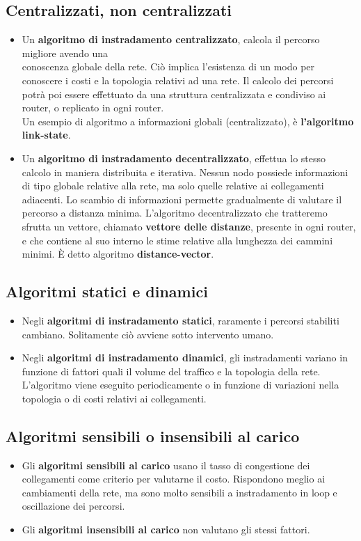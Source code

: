 \subsection{Centralizzati, non centralizzati}
\begin{itemize}
	\item Un \textbf{algoritmo di instradamento centralizzato}, calcola il percorso migliore avendo una\\ conoscenza globale della rete. Ciò implica l'esistenza di un modo per conoscere i costi e la topologia relativi ad una rete. Il calcolo dei percorsi potrà poi essere effettuato da una struttura centralizzata e condiviso ai router, o replicato in ogni router.\\
	Un esempio di algoritmo a informazioni globali (centralizzato), è \textbf{l'algoritmo link-state}.
	
	\item Un \textbf{algoritmo di instradamento decentralizzato}, effettua lo stesso calcolo in maniera distribuita e iterativa. Nessun nodo possiede informazioni di tipo globale relative alla rete, ma solo quelle relative ai collegamenti adiacenti. Lo scambio di informazioni permette gradualmente di valutare il percorso a distanza minima. L'algoritmo decentralizzato che tratteremo sfrutta un vettore, chiamato \textbf{vettore delle distanze}, presente in ogni router, e che contiene al suo interno le stime relative alla lunghezza dei cammini minimi. È detto algoritmo \textbf{distance-vector}.
\end{itemize}

\subsection{Algoritmi statici e dinamici}
\begin{itemize}
	\item Negli \textbf{algoritmi di instradamento statici}, raramente i percorsi stabiliti cambiano. Solitamente ciò avviene sotto intervento umano.
	\item Negli \textbf{algoritmi di instradamento dinamici}, gli instradamenti variano in funzione di fattori quali il volume del traffico e la topologia della rete. L'algoritmo viene eseguito periodicamente o in funzione di variazioni nella topologia o di costi relativi ai collegamenti.
\end{itemize}
\newpage

\subsection{Algoritmi sensibili o insensibili al carico}
\begin{itemize}
	\item Gli \textbf{algoritmi sensibili al carico} usano il tasso di congestione dei collegamenti come criterio per valutarne il costo. Rispondono meglio ai cambiamenti della rete, ma sono molto sensibili a instradamento in loop e oscillazione dei percorsi.
	
	\item Gli \textbf{algoritmi insensibili al carico} non valutano gli stessi fattori.
\end{itemize}


